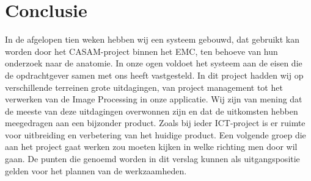 \section{Conclusie}
\label{Conclusie}
In de afgelopen tien weken hebben wij een systeem gebouwd, dat gebruikt kan worden door het CASAM-project binnen het EMC, ten behoeve van hun onderzoek naar de anatomie.
In onze ogen voldoet het systeem aan de eisen die de opdrachtgever samen met ons heeft vastgesteld. 
In dit project hadden wij op verschillende terreinen grote uitdagingen,
van project management tot het verwerken van de Image Processing in onze applicatie.
Wij zijn van mening dat de meeste van deze uitdagingen overwonnen zijn en dat de uitkomsten hebben meegedragen aan een bijzonder product. 
Zoals bij ieder ICT-project is er ruimte voor uitbreiding en verbetering van het huidige product.
Een volgende groep die aan het project gaat werken zou moeten kijken in welke richting men door wil gaan.
De punten die genoemd worden in dit verslag kunnen als uitgangspositie gelden voor het plannen van de werkzaamheden.
